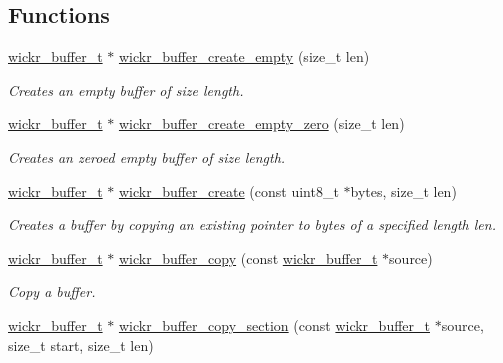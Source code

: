\subsection*{Functions}
\begin{DoxyCompactItemize}
\item 
\mbox{\hyperlink{structwickr__buffer}{wickr\+\_\+buffer\+\_\+t}} $\ast$ \mbox{\hyperlink{group__wickr__buffer_ga305edd191e38eb040710b631c1e4f05f}{wickr\+\_\+buffer\+\_\+create\+\_\+empty}} (size\+\_\+t len)
\begin{DoxyCompactList}\small\item\em Creates an empty buffer of size length. \end{DoxyCompactList}\item 
\mbox{\hyperlink{structwickr__buffer}{wickr\+\_\+buffer\+\_\+t}} $\ast$ \mbox{\hyperlink{group__wickr__buffer_gaba0ae148a2f75e50eb3d36a4bef509d2}{wickr\+\_\+buffer\+\_\+create\+\_\+empty\+\_\+zero}} (size\+\_\+t len)
\begin{DoxyCompactList}\small\item\em Creates an zeroed empty buffer of size length. \end{DoxyCompactList}\item 
\mbox{\hyperlink{structwickr__buffer}{wickr\+\_\+buffer\+\_\+t}} $\ast$ \mbox{\hyperlink{group__wickr__buffer_gacc3ad1220af28781bf678cab20e2f1c8}{wickr\+\_\+buffer\+\_\+create}} (const uint8\+\_\+t $\ast$bytes, size\+\_\+t len)
\begin{DoxyCompactList}\small\item\em Creates a buffer by copying an existing pointer to bytes of a specified length len. \end{DoxyCompactList}\item 
\mbox{\hyperlink{structwickr__buffer}{wickr\+\_\+buffer\+\_\+t}} $\ast$ \mbox{\hyperlink{group__wickr__buffer_gada179dda91e748d7bdf6028d3d4c4bcd}{wickr\+\_\+buffer\+\_\+copy}} (const \mbox{\hyperlink{structwickr__buffer}{wickr\+\_\+buffer\+\_\+t}} $\ast$source)
\begin{DoxyCompactList}\small\item\em Copy a buffer. \end{DoxyCompactList}\item 
\mbox{\hyperlink{structwickr__buffer}{wickr\+\_\+buffer\+\_\+t}} $\ast$ \mbox{\hyperlink{group__wickr__buffer_gaceb6345c35ac2f6330ea0a685ce3fc53}{wickr\+\_\+buffer\+\_\+copy\+\_\+section}} (const \mbox{\hyperlink{structwickr__buffer}{wickr\+\_\+buffer\+\_\+t}} $\ast$source, size\+\_\+t start, size\+\_\+t len)

\end{DoxyCompactItemize}
